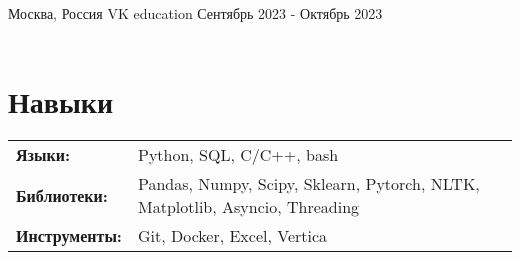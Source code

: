 \documentclass[letterpaper,10pt]{article}
\begin{document}
    \resumeEducationSubheading
    {}{Москва, Россия}
    {VK education}{ Сентябрь 2023 - Октябрь 2023 } \\\\
      
    
  \resumeSubHeadingListEnd

  


\section{Навыки}
 \begin{tabular}{ll}
 \textbf{Языки:} & \quad Python, SQL, C/C++, bash
 \\ 
 \textbf{Библиотеки:} & \quad Pandas, Numpy, Scipy, Sklearn, Pytorch, NLTK, Matplotlib, Asyncio, Threading \\ 
 \textbf{Инструменты:} & \quad Git, Docker, Excel, Vertica\\ 
\end{tabular}
\end{document}
